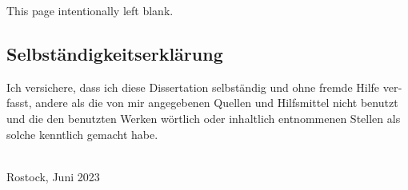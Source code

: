 \documentclass[
version=3.28,  %
a4paper,
11pt,
twoside,
openright,
cleardoublepage=empty,
BCOR=10mm,
DIV=12,
footinclude=false,
chapterprefix,
appendixprefix,
final,
]{scrbook}
\newcommand*{\mychapterformat}[1]{%
\hfill\chapappifchapterprefix{\ }\raisebox{-.4\baselineskip}[0pt][0pt]{%
\scalebox{4}{\rmfamily#1\thechapter\autodot}}%
\\[-.7\baselineskip]%
\textcolor{white}{\rule{\textwidth}{.5mm}}\\[-\baselineskip]%
\vspace{2mm}
\textcolor{white}{\rule{\textwidth}{.5mm}}\\[-\baselineskip]%
\vspace{2mm}
\textcolor{white}{\rule{\textwidth}{.5mm}}%
}
\renewcommand*{\chapterformat}{\mychapterformat{\itshape}}
\begin{document}
\begin{appendices}
\renewcommand{\thechapter}{%
\texorpdfstring{\textsc{\alph{chapter}}}{\Alph{chapter}}}
\renewcommand*{\chapterformat}{\mychapterformat{\mdseries}}


\setlength{\parindent}{0pt}
\setlength{\parskip}{.5\baselineskip plus .5\baselineskip}
\setlength{\parfillskip}{1em plus 1fil}

\cleardoubleoddpage
\thispagestyle{empty}
\mbox{}
\vfill
\markboth{}{}%
{\centering
 \normalfont
 \Huge \bfseries \sffamily \appendixpagename\par}%
\vfill

\clearpage
\thispagestyle{empty}
\mbox{}
\vfill
\centerline{\tiny This page intentionally left blank.}
\vfill
\vfill
\vfill
\clearpage





\end{appendices}

\backmatter

\printbibliography[title=References,heading=bibintoc]

\newpage

\begin{german}
\chapter*{Selbständigkeitserklärung}

Ich versichere, dass ich diese Dissertation
selbständig und ohne fremde Hilfe verfasst,
andere als die von mir angegebenen Quellen
und Hilfsmittel nicht benutzt und
die den benutzten Werken wörtlich oder inhaltlich entnommenen Stellen
als solche kenntlich gemacht habe.

\baselineskip

\noindent
\theauthor\\
Rostock, Juni 2023

\end{german}
\end{document}
